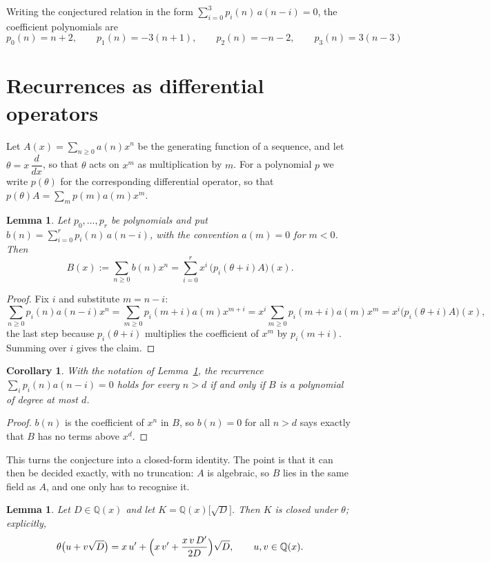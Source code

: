 \documentclass[11pt,a4paper]{article}
\theoremstyle{plain}
\newtheorem{lemma}[theorem]{Lemma}
\newtheorem{corollary}[theorem]{Corollary}
\theoremstyle{definition}
\begin{document}
Writing the conjectured relation in the form $\sum_{i=0}^{3}p_{i}(n)\,a(n-i)=0$,
the coefficient polynomials are
\[
p_{0}(n)=n + 2,\qquad p_{1}(n)=- 3 \left(n + 1\right),\qquad p_{2}(n)=- n - 2,\qquad p_{3}(n)=3 \left(n - 3\right)
\]

\section{Recurrences as differential operators}

Let $A(x)=\sum_{n\ge0}a(n)x^{n}$ be the generating function of a sequence, and let
$\theta=x\,\dfrac{d}{dx}$, so that $\theta$ acts on $x^{m}$ as multiplication by $m$. For a
polynomial $p$ we write $p(\theta)$ for the corresponding differential operator, so that
$p(\theta)A=\sum_{m}p(m)a(m)x^{m}$.

\begin{lemma}\label{lem:transfer}
Let $p_{0},\dots,p_{r}$ be polynomials and put $b(n)=\sum_{i=0}^{r}p_{i}(n)\,a(n-i)$, with
the convention $a(m)=0$ for $m<0$. Then
\[
B(x):=\sum_{n\ge0}b(n)x^{n}=\sum_{i=0}^{r}x^{i}\,\bigl(p_{i}(\theta+i)A\bigr)(x).
\]
\end{lemma}

\begin{proof}
Fix $i$ and substitute $m=n-i$:
\[
\sum_{n\ge0}p_{i}(n)a(n-i)x^{n}=\sum_{m\ge0}p_{i}(m+i)a(m)x^{m+i}
=x^{i}\sum_{m\ge0}p_{i}(m+i)a(m)x^{m}=x^{i}\bigl(p_{i}(\theta+i)A\bigr)(x),
\]
the last step because $p_{i}(\theta+i)$ multiplies the coefficient of $x^{m}$ by
$p_{i}(m+i)$. Summing over $i$ gives the claim.
\end{proof}

\begin{corollary}\label{cor:criterion}
With the notation of Lemma~\ref{lem:transfer}, the recurrence
$\sum_{i}p_{i}(n)a(n-i)=0$ holds for every $n>d$ if and only if $B$ is a polynomial of
degree at most $d$.
\end{corollary}

\begin{proof}
$b(n)$ is the coefficient of $x^{n}$ in $B$, so $b(n)=0$ for all $n>d$ says exactly that
$B$ has no terms above $x^{d}$.
\end{proof}

This turns the conjecture into a closed-form identity. The point is that it can then be
decided exactly, with no truncation: $A$ is algebraic, so $B$ lies in the same field as
$A$, and one only has to recognise it.

\begin{lemma}\label{lem:field}
Let $D\in\mathbb{Q}(x)$ and let $K=\mathbb{Q}(x)\bigl[\sqrt{D}\bigr]$. Then $K$ is closed
under $\theta$; explicitly,
\[
\theta\bigl(u+v\sqrt{D}\bigr)=x\,u'+\Bigl(x\,v'+\frac{x\,v\,D'}{2D}\Bigr)\sqrt{D},
\qquad u,v\in\mathbb{Q}(x).
\]
\end{lemma}
\end{document}
